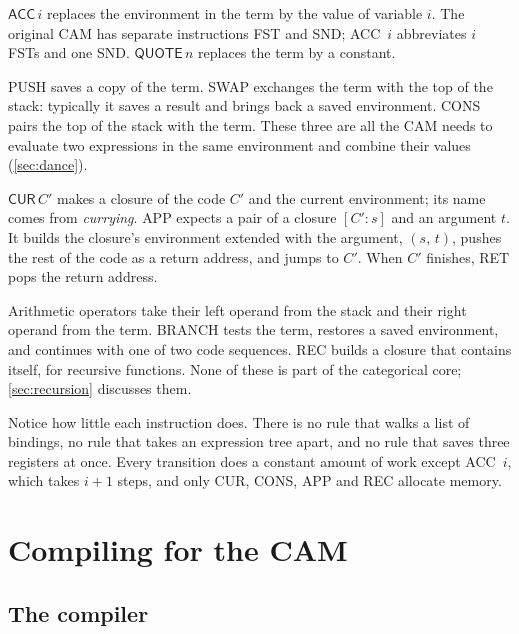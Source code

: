 \documentclass[11pt,a4paper]{article}
\newcommand{\ins}[1]{\textsf{#1}}
\newcommand{\clo}[2]{[#1 : #2]}
\newcommand{\pr}[2]{(#1,\, #2)}
\theoremstyle{definition}
\theoremstyle{plain}
\begin{document}
\begin{description}[style=nextline, leftmargin=1.2em, itemsep=3pt]
\item[Loading the term.] $\ins{ACC}\,i$ replaces the environment in the term
  by the value of variable $i$. The original CAM has separate instructions
  \ins{FST} and \ins{SND}; \ins{ACC}~$i$ abbreviates $i$ \ins{FST}s and one
  \ins{SND}. $\ins{QUOTE}\,n$ replaces the term by a constant.
\item[The stack.] \ins{PUSH} saves a copy of the term. \ins{SWAP} exchanges
  the term with the top of the stack: typically it saves a result and brings
  back a saved environment. \ins{CONS} pairs the top of the stack with the
  term. These three are all the CAM needs to evaluate two expressions in the
  same environment and combine their values (\cref{sec:dance}).
\item[Functions.] $\ins{CUR}\,C'$ makes a closure of the code $C'$ and the
  current environment; its name comes from \emph{currying}. \ins{APP} expects a
  pair of a closure $\clo{C'}{s}$ and an argument $t$. It builds the closure's
  environment extended with the argument, $\pr{s}{t}$, pushes the rest of the
  code as a return address, and jumps to $C'$. When $C'$ finishes, \ins{RET}
  pops the return address.
\item[Extensions.] Arithmetic operators take their left operand from the
  stack and their right operand from the term. \ins{BRANCH} tests the term,
  restores a saved environment, and continues with one of two code sequences.
  \ins{REC} builds a closure that contains itself, for recursive functions.
  None of these is part of the categorical core; \cref{sec:recursion}
  discusses them.
\end{description}

Notice how little each instruction does. There is no rule that walks a list
of bindings, no rule that takes an expression tree apart, and no rule that
saves three registers at once. Every transition does a constant amount of work
except \ins{ACC}~$i$, which takes $i+1$ steps, and only \ins{CUR}, \ins{CONS},
\ins{APP} and \ins{REC} allocate memory.

\section{Compiling for the CAM}\label{sec:compiling}

\subsection{The compiler}
\end{document}
